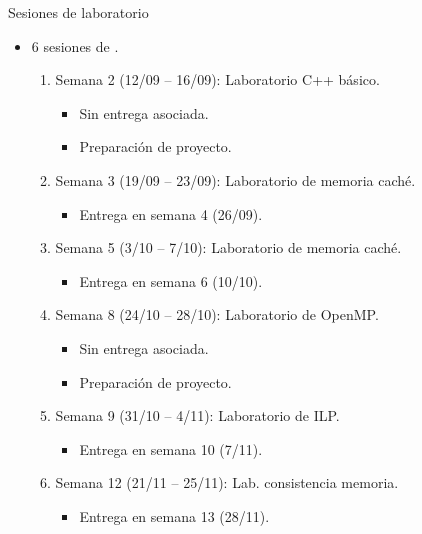 \begin{frame}[t,plain]{Sesiones de laboratorio}
\begin{itemize}
  \item 6 sesiones de .

    \begin{enumerate}
      \item Semana 2 (12/09 -- 16/09): Laboratorio C++ básico.
        \begin{itemize}
          \item Sin entrega asociada.
          \item Preparación de proyecto.
        \end{itemize}
      \item Semana 3 (19/09 -- 23/09): Laboratorio de memoria caché.
        \begin{itemize}
          \item Entrega en semana 4 (26/09).
        \end{itemize}
      \item Semana 5 (3/10 -- 7/10): Laboratorio de memoria caché.
        \begin{itemize}
          \item Entrega en semana 6 (10/10).
        \end{itemize}
      \item Semana 8 (24/10 -- 28/10): Laboratorio de OpenMP.
        \begin{itemize}
          \item Sin entrega asociada.
          \item Preparación de proyecto.
        \end{itemize}
      \item Semana 9 (31/10 -- 4/11): Laboratorio de ILP.
        \begin{itemize}
          \item Entrega en semana 10 (7/11).
        \end{itemize}
      \item Semana 12 (21/11 -- 25/11): Lab. consistencia memoria.
        \begin{itemize}
          \item Entrega en semana 13 (28/11).
        \end{itemize}
    \end{enumerate}
\end{itemize}
\end{frame}


